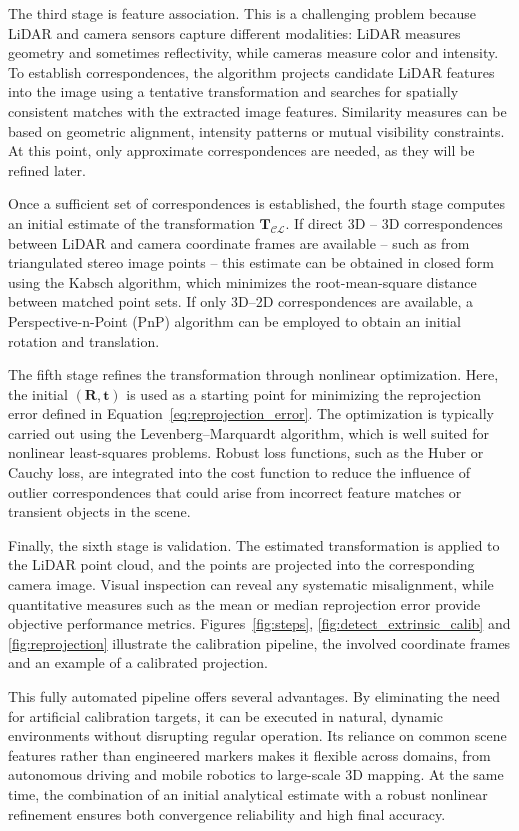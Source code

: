 \documentclass[english, bachelor, utf8]{base/thesis_telematics}
\begin{document}
The third stage is feature association. This is a challenging problem because LiDAR and camera sensors capture different modalities: LiDAR measures geometry and sometimes 
reflectivity, while cameras measure color and intensity. To establish correspondences, the algorithm projects candidate LiDAR features into the image using a tentative 
transformation and searches for spatially consistent matches with the extracted image features. Similarity measures can be based on geometric alignment, intensity patterns 
or mutual visibility constraints. At this point, only approximate correspondences are needed, as they will be refined later.

Once a sufficient set of correspondences is established, the fourth stage computes an initial estimate of the transformation $\mathbf{T}_{\mathcal{CL}}$. 
If direct 3D -- 3D correspondences between LiDAR and camera coordinate frames are available -- such as from triangulated stereo image points -- this estimate can be obtained in 
closed form using the Kabsch algorithm, which minimizes the root-mean-square distance between matched point sets. If only 3D–2D correspondences are available, 
a Perspective-n-Point (PnP) algorithm can be employed to obtain an initial rotation and translation.

The fifth stage refines the transformation through nonlinear optimization. Here, the initial $(\mathbf{R}, \mathbf{t})$ is used as a starting point for minimizing the 
reprojection error defined in Equation~\ref{eq:reprojection_error}. The optimization is typically carried out using the Levenberg–Marquardt algorithm, which is well 
suited for nonlinear least-squares problems. Robust loss functions, such as the Huber or Cauchy loss, are integrated into the cost function to reduce the influence of 
outlier correspondences that could arise from incorrect feature matches or transient objects in the scene.

Finally, the sixth stage is validation. The estimated transformation is applied to the LiDAR point cloud, and the points are projected into the corresponding camera image. 
Visual inspection can reveal any systematic misalignment, while quantitative measures such as the mean or median reprojection error provide objective performance metrics. 
Figures~\ref{fig:steps}, \ref{fig:detect_extrinsic_calib} and \ref{fig:reprojection} illustrate the calibration pipeline, the involved coordinate frames and an example of a calibrated projection.

This fully automated pipeline offers several advantages. By eliminating the need for artificial calibration targets, it can be executed in natural, dynamic environments 
without disrupting regular operation. Its reliance on common scene features rather than engineered markers makes it flexible across domains, from autonomous driving and 
mobile robotics to large-scale 3D mapping. At the same time, the combination of an initial analytical estimate with a robust nonlinear refinement ensures both convergence 
reliability and high final accuracy.
\end{document}
